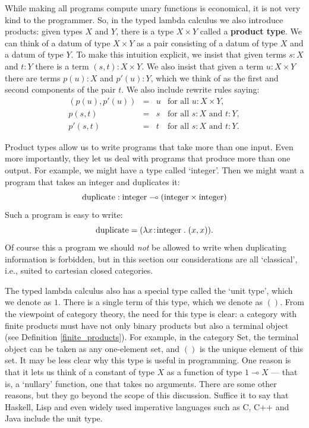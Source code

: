 \documentclass[12pt,twoside,openright]{report}
\newcommand{\Set}{\mathrm{Set}}
\newcommand{\lhom}{\multimap}
\newcommand{\integer}{{\rm integer}}
\newcommand{\duplicate}{{\rm duplicate}}
\begin{document}
While making all programs compute unary functions is economical, it is not very kind to the programmer.  So, in the typed lambda calculus we also introduce products: given types $X$ and $Y$, there is a type $X
\times Y$ called a {\bf product type}.  We can think of a datum of type $X \times Y$ as a pair consisting of a datum of type $X$ and a datum of type $Y$.  To make this intuition explicit, we insist that given terms $s:X$ and $t:Y$ there is a term $(s,t):X \times Y$.  We also insist that given a term $u:X \times Y$ there are terms $p(u):X$
and $p'(u):Y$, which we think of as the first and second components of the pair $t$.  We also include rewrite rules saying:
\[      
\begin{array}{ccll}
(p(u),p'(u)) &=& u & \textrm{for all } u:X \times Y, \\
p(s,t) &=& s  & \textrm{for all } s\!:\!X \textrm{ and } t\!:\!Y, \\
p'(s,t) &=& t & \textrm{for all } s\!:\!X \textrm{ and } t\!:\!Y .
\end{array}
\]

Product types allow us to write programs that take more than one input.  Even more importantly, they let us deal with programs that produce more than one output.  For example, we might have a type called `integer'.  Then we might want a program that takes an integer and duplicates it:
\[ 
  \duplicate: \integer \lhom (\integer \times \integer)
\]
Such a program is easy to write:
\[  \duplicate = (\lambda x\!:\!\integer \;.\; (x,x))  .\]
Of course this a program we should {\it not} be allowed to write when duplicating information is forbidden, but in this section our considerations are all `classical', i.e., suited to cartesian closed categories.

The typed lambda calculus also has a special type called the `unit type', which we denote as $1$.  There is a single term of this type, which we denote as $()$.  From the viewpoint of category theory, the need for this type is clear: a category with finite products must have not only binary products but also a terminal object (see Definition
\ref{finite_products}).  For example, in the category $\Set$, the terminal object can be taken as any one-element set, and $()$ is the unique element of this set.  It may be less clear why this type is useful in programming.  One reason is that it lets us think of a constant of type $X$ as a function of type $1 \lhom X$ --- that is, a `nullary' function, one that takes no arguments.  There are some other reasons, but they go beyond the scope of this discussion. Suffice it to say that Haskell, Lisp and even widely used imperative languages such as C, C++ and Java include the unit type.
\end{document}
